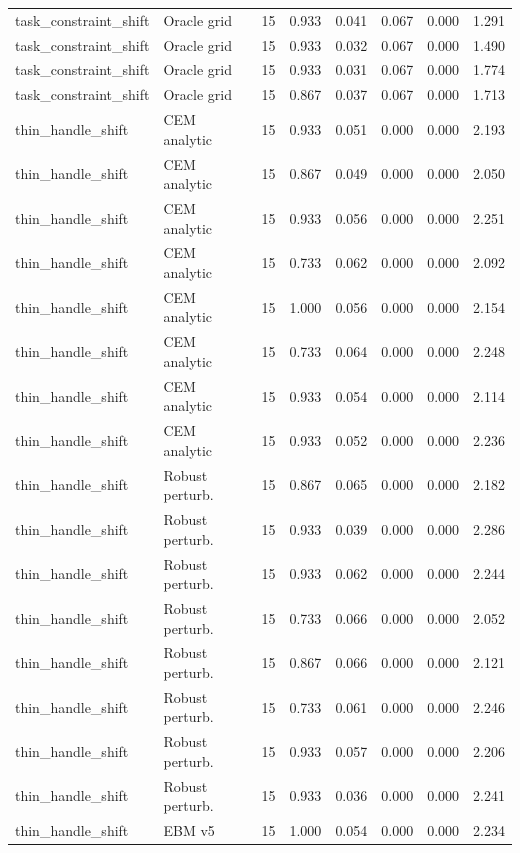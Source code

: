 {\begin{longtable}{llrrrrrr}
task\_constraint\_shift & Oracle grid & 15 & 0.933 & 0.041 & 0.067 & 0.000 & 1.291 \\
task\_constraint\_shift & Oracle grid & 15 & 0.933 & 0.032 & 0.067 & 0.000 & 1.490 \\
task\_constraint\_shift & Oracle grid & 15 & 0.933 & 0.031 & 0.067 & 0.000 & 1.774 \\
task\_constraint\_shift & Oracle grid & 15 & 0.867 & 0.037 & 0.067 & 0.000 & 1.713 \\
thin\_handle\_shift & CEM analytic & 15 & 0.933 & 0.051 & 0.000 & 0.000 & 2.193 \\
thin\_handle\_shift & CEM analytic & 15 & 0.867 & 0.049 & 0.000 & 0.000 & 2.050 \\
thin\_handle\_shift & CEM analytic & 15 & 0.933 & 0.056 & 0.000 & 0.000 & 2.251 \\
thin\_handle\_shift & CEM analytic & 15 & 0.733 & 0.062 & 0.000 & 0.000 & 2.092 \\
thin\_handle\_shift & CEM analytic & 15 & 1.000 & 0.056 & 0.000 & 0.000 & 2.154 \\
thin\_handle\_shift & CEM analytic & 15 & 0.733 & 0.064 & 0.000 & 0.000 & 2.248 \\
thin\_handle\_shift & CEM analytic & 15 & 0.933 & 0.054 & 0.000 & 0.000 & 2.114 \\
thin\_handle\_shift & CEM analytic & 15 & 0.933 & 0.052 & 0.000 & 0.000 & 2.236 \\
thin\_handle\_shift & Robust perturb. & 15 & 0.867 & 0.065 & 0.000 & 0.000 & 2.182 \\
thin\_handle\_shift & Robust perturb. & 15 & 0.933 & 0.039 & 0.000 & 0.000 & 2.286 \\
thin\_handle\_shift & Robust perturb. & 15 & 0.933 & 0.062 & 0.000 & 0.000 & 2.244 \\
thin\_handle\_shift & Robust perturb. & 15 & 0.733 & 0.066 & 0.000 & 0.000 & 2.052 \\
thin\_handle\_shift & Robust perturb. & 15 & 0.867 & 0.066 & 0.000 & 0.000 & 2.121 \\
thin\_handle\_shift & Robust perturb. & 15 & 0.733 & 0.061 & 0.000 & 0.000 & 2.246 \\
thin\_handle\_shift & Robust perturb. & 15 & 0.933 & 0.057 & 0.000 & 0.000 & 2.206 \\
thin\_handle\_shift & Robust perturb. & 15 & 0.933 & 0.036 & 0.000 & 0.000 & 2.241 \\
thin\_handle\_shift & EBM v5 & 15 & 1.000 & 0.054 & 0.000 & 0.000 & 2.234 \\

\end{longtable}}
